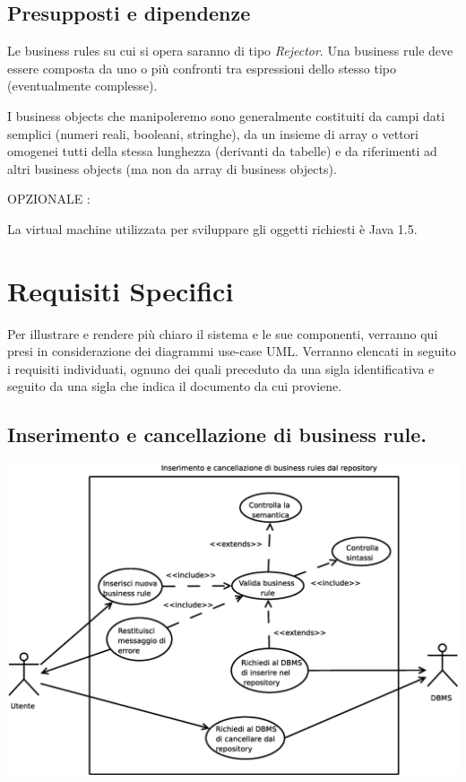 \documentclass[11pt,titlepage,a4paper]{report}
\begin{document}
\section{Presupposti e dipendenze}
\begin{itemize}
\item{Le business rules su cui si opera saranno di tipo \textit{Rejector}. Una business rule deve essere composta da uno o pi\`u confronti tra espressioni dello stesso tipo (eventualmente complesse).}
\item{I business objects che manipoleremo sono generalmente costituiti da campi dati semplici (numeri reali, booleani, stringhe), da un insieme di array o vettori omogenei tutti della stessa lunghezza (derivanti da tabelle) e da riferimenti ad altri business objects (ma non da array di business objects). \item[NQ4]{ OPZIONALE :   }
}
\item{La virtual machine utilizzata  per sviluppare gli oggetti richiesti \`e Java 1.5.}
\end{itemize}

\chapter{Requisiti Specifici}
Per illustrare e rendere pi\`u chiaro il sistema e le sue componenti, verranno qui presi in considerazione dei diagrammi use-case UML. Verranno elencati in seguito i requisiti individuati, ognuno dei quali preceduto da una sigla identificativa e seguito da una sigla che indica il documento da cui proviene.


\section{Inserimento e cancellazione di business rule.}
\begin{center}
 \includegraphics[width=1\textwidth]{Inserisci-regola.eps}
\end{center}
\end{document}
